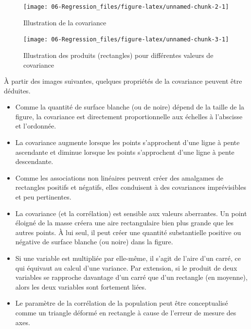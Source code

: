 \documentclass[
]{book}
\begin{document}
\begin{figure}

{\centering \texttt{[image: 06-Regression\_files/figure-latex/unnamed-chunk-2-1]} 

}

\caption{Illustration de la covariance}\label{fig:unnamed-chunk-2}
\end{figure}

\begin{figure}

{\centering \texttt{[image: 06-Regression\_files/figure-latex/unnamed-chunk-3-1]} 

}

\caption{Illustration des produits (rectangles) pour différentes valeurs de covariance}\label{fig:unnamed-chunk-3}
\end{figure}

À partir des images suivantes, quelques propriétés de la covariance peuvent être déduites.

\begin{itemize}
\item
  Comme la quantité de surface blanche (ou de noire) dépend de la taille de la figure, la covariance est directement proportionnelle aux échelles à l'abscisse et l'ordonnée.
\item
  La covariance augmente lorsque les points s'approchent d'une ligne à pente ascendante et diminue lorsque les points s'approchent d'une ligne à pente descendante.
\item
  Comme les associations non linéaires peuvent créer des amalgames de rectangles positifs et négatifs, elles conduisent à des covariances imprévisibles et peu pertinentes.
\item
  La covariance (et la corrélation) est sensible aux valeurs aberrantes. Un point éloigné de la masse créera une aire rectangulaire bien plus grande que les autres points. À lui seul, il peut créer une quantité substantielle positive ou négative de surface blanche (ou noire) dans la figure.
\item
  Si une variable est multipliée par elle-même, il s'agit de l'aire d'un carré, ce qui équivaut au calcul d'une variance. Par extension, si le produit de deux variables se rapproche davantage d'un carré que d'un rectangle (en moyenne), alors les deux variables sont fortement liées.
\item
  Le paramètre de la corrélation de la population peut être conceptualisé comme un triangle déformé en rectangle à cause de l'erreur de mesure des axes.
\end{itemize}
\end{document}
